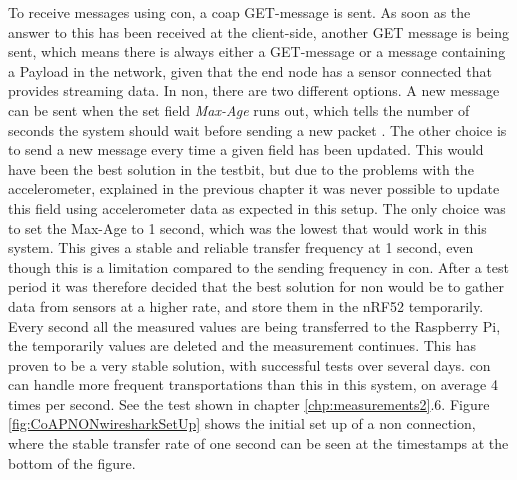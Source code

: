 To receive messages using \gls{con}, a \gls{coap} GET-message is sent. As soon as the answer to this has been received at the client-side, another GET message is being sent, which means there is always either a GET-message or a message containing a Payload in the network, given that the end node has a sensor connected that provides streaming data. In \gls{non}, there are two different options. A new message can be sent when the set field \textit{Max-Age} runs out, which tells the number of seconds the system should wait before sending a new packet \cite{shelby2014constrained}. The other choice is to send a new message every time a given field has been updated. This would have been the best solution in the testbit, but due to the problems with the accelerometer, explained in the previous chapter it was never possible to update this field using accelerometer data as expected in this setup. The only choice was to set the Max-Age to 1 second, which was the lowest that would work in this system. This gives a stable and reliable transfer frequency at 1 second, even though this is a limitation compared to the sending frequency in \gls{con}. After a test period it was therefore decided that the best solution for \gls{non} would be to gather data from sensors at a higher rate, and store them in the nRF52 temporarily. Every second all the measured values are being transferred to the Raspberry Pi, the temporarily values are deleted and the measurement continues. This has proven to be a very stable solution, with successful tests over several days. \gls{con} can handle more frequent transportations than this in this system, on average 4 times per second. See the test shown in chapter \ref{chp:measurements2}.6. Figure  \ref{fig:CoAPNONwiresharkSetUp} shows the initial set up of a \gls{non} connection, where the stable transfer rate of one second can be seen at the timestamps at the bottom of the figure. 




